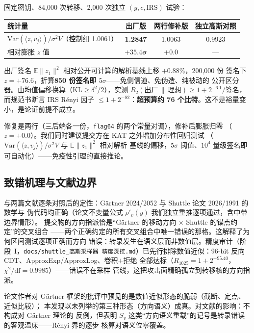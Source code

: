 \documentclass[UTF8,11pt,a4paper]{ctexart}
\newcommand{\code}[1]{\texttt{\small #1}}
\begin{document}
固定密钥、84{,}000 次转移、2{,}000 次独立 $(y, c, \mathrm{IRS})$ 试验：

\begin{table}[htbp]\centering\small
\begin{tabular}{@{}lccc@{}}
\toprule
统计量 & 出厂版 & 两行修补版 & 独立高斯对照 \\
\midrule
$\mathrm{Var}(\langle z, v_j\rangle)/\sigma^2 V$（控制组 1.0061） & \textbf{1.2847} & 1.0063 & 0.9923 \\
相对膨胀 $z$ 值 & $\bm{+35.4\sigma}$ & $+0.0$ & --- \\
\bottomrule
\end{tabular}
\end{table}

出厂签名 $\mathbb{E}\|z_1\|^2$ 相对公开可计算的解析基线上移 $+0.88\%$，200{,}000 份
签名下 $z = +76.6$，折算\textbf{850 份签名即 $5\sigma$}——免侧信道、免伪造、纯被动的
公开区分器。由均值偏移换算（$\mathrm{KL} \ge \delta^2/2$），实测
$R_2(\text{出厂} \,\|\, \text{理想}) \ge 1 + 2^{-6.1}/$签名，而规范书断言 IRS R\'enyi
因子 $\le 1 + 2^{-82}$：\textbf{超预算约 76 个比特}。这不是裕量变小，是论证前提不成立。

修复是两行（三后端各一份，\code{flag64} 的两个常量对调），修补后膨胀归零
（$z = +0.0$）。我们同时建议提交方在 KAT 之外增加分布性回归测试
（$\mathrm{Var}(\langle z, v_j\rangle)/\sigma^2 V$ 与 $\mathbb{E}\|z_1\|^2$ 相对解析
基线的偏移，$5\sigma$ 阈值、$10^4$ 量级签名即可自动化）——免疫性引理的直接推论。

\subsection{致错机理与文献边界}

与两篇文献逐条对照后的定性：G\"artner 2024/2052 与 Shuttle 论文 2026/1991 的数学与
伪代码均正确（论文不变量公式 $\rho'_v(y)$ 我们独立重推逐项通过，含中带边界情形）。
提交物的方向指派恰是``G\"artner 的移动方向 $\times$ Shuttle 的锚点约定''的交叉组合
——两个正确约定的所有交叉组合中唯一错误的那格。这解释了为何区间测试逐项正确而方向
错误：转录发生在语义层而非数值层。精度审计（阶段~I，\code{docs/shuttle\_高斯采样器
精度深挖.md}）已先行排除数值近似：96-bit 反向 CDT、ApproxExp/ApproxLog、卷积$+$拒绝
全部达标（$R_{1025} = 1+2^{-95.40}$，$\chi^2/\mathrm{df} = 0.9985$）——错误不在采样
管线，这把攻击面精确孤立到转移核的方向指派。

论文作者对 G\"artner 框架的批评中预见的是数值近似形态的脆弱（截断、定点、近似比较）；
本发现以未列举的第三种形态（方向语义）成真。对文献的影响：不构成对 G\"artner 理论的
反例，但表明 $S_v$ 这类``方向语义重载''的记号是转录错误的客观温床——R\'enyi 界的逐步
核算对语义位零覆盖。
\end{document}
